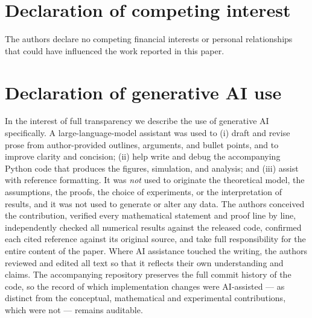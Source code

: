 \documentclass[10pt,twocolumn]{article}
\theoremstyle{definition}
\begin{document}
\section*{Declaration of competing interest}
The authors declare no competing financial interests or personal relationships that could have influenced the work reported in this paper.

\section*{Declaration of generative AI use}
In the interest of full transparency we describe the use of generative AI specifically. A large-language-model assistant was used to (i) draft and revise prose from author-provided outlines, arguments, and bullet points, and to improve clarity and concision; (ii) help write and debug the accompanying Python code that produces the figures, simulation, and analysis; and (iii) assist with reference formatting. It was \emph{not} used to originate the theoretical model, the assumptions, the proofs, the choice of experiments, or the interpretation of results, and it was not used to generate or alter any data. The authors conceived the contribution, verified every mathematical statement and proof line by line, independently checked all numerical results against the released code, confirmed each cited reference against its original source, and take full responsibility for the entire content of the paper. Where AI assistance touched the writing, the authors reviewed and edited all text so that it reflects their own understanding and claims. The accompanying repository preserves the full commit history of the code, so the record of which implementation changes were AI-assisted --- as distinct from the conceptual, mathematical and experimental contributions, which were not --- remains auditable.
\end{document}
